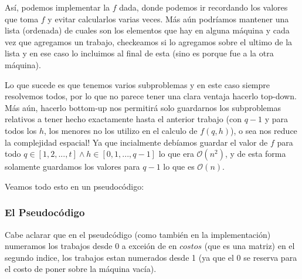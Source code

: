 \documentclass[A4paper,oneside,fleqn,11pt]{article}
\theoremstyle{definition}
\begin{document}
Así, podemos implementar la $f$ dada, donde podemos ir recordando los valores que toma $f$ y evitar calcularlos varias veces. Más aún podríamos mantener una lista (ordenada) de cuales son los elementos que hay en alguna máquina y cada vez que agregamos un trabajo, checkeamos si lo agregamos sobre el ultimo de la lista y en ese caso lo incluimos al final de esta (sino es porque fue a la otra máquina).

Lo que sucede es que tenemos varios subproblemas y en este caso siempre resolvemos todos, por lo que no parece tener una clara ventaja hacerlo top-down. Más aún, hacerlo bottom-up nos permitirá solo guardarnos los subproblemas relativos a tener hecho exactamente hasta el anterior trabajo (con $q-1$ y para todos los $h$, los menores no los utilizo en el calculo de $f(q,h)$), o sea nos reduce la complejidad espacial! Ya que incialmente debíamos guardar el valor de $f$ para todo $q \in [1,2,...,t] \land h \in [0,1,...,q-1]$ lo que era $\mathcal{O}(n^2)$, y de esta forma solamente guardamos los valores para $q-1$ lo que es $\mathcal{O}(n)$.

 Veamos todo esto en un pseudocódigo:
\subsubsection{El Pseudocódigo}

Cabe aclarar que en el pseudcódigo (como también en la implementación) numeramos los trabajos desde 0 a exceión de en $costos$ (que es una matriz) en el segundo indice, los trabajos estan numerados desde 1 (ya que el 0 se reserva para el costo de poner sobre la máquina vacía).
\end{document}
